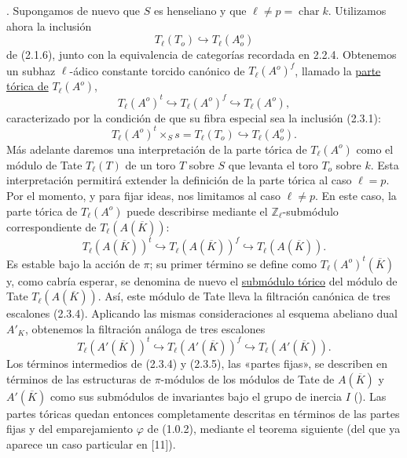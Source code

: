 \par\medskip
{}. Supongamos de nuevo que $S$ es henseliano y que
$\ell\ne p=\operatorname{char}k$. Utilizamos ahora la inclusión
\begin{equation}\tag{2.3.1}
 T_\ell(T_o)\hookrightarrow T_\ell(A_o^o)
\end{equation}
de (2.1.6), junto con la equivalencia de categorías recordada en 2.2.4.
Obtenemos un subhaz $\ell$-ádico constante torcido canónico de
$T_\ell(A^o)^f$, llamado la \underline{parte tórica de}
$T_\ell(A^o)$,
\begin{equation}\tag{2.3.2}
 T_\ell(A^o)^t\hookrightarrow T_\ell(A^o)^f
 \hookrightarrow T_\ell(A^o),
\end{equation}
caracterizado por la condición de que su fibra especial sea la
inclusión (2.3.1):
\begin{equation}\tag{2.3.3}
 T_\ell(A^o)^t\times_Ss=T_\ell(T_o)
 \hookrightarrow T_\ell(A_o^o).
\end{equation}
Más adelante daremos una interpretación de la parte tórica de
$T_\ell(A^o)$ como el módulo de Tate $T_\ell(T)$ de un toro $T$ sobre
$S$ que levanta el toro $T_o$ sobre $k$. Esta interpretación permitirá
extender la definición de la parte tórica al caso $\ell=p$. Por el
momento, y para fijar ideas, nos limitamos al caso $\ell\ne p$. En este
caso, la parte tórica de $T_\ell(A^o)$ puede describirse mediante el
$\mathbb Z_\ell$-submódulo correspondiente de
$T_\ell(A(\overline K))$:
\begin{equation}\tag{2.3.4}
 T_\ell(A(\overline K))^t\hookrightarrow
 T_\ell(A(\overline K))^f\hookrightarrow
 T_\ell(A(\overline K)).
\end{equation}
Es estable bajo la acción de $\pi$; su primer término se define como
$T_\ell(A^o)^t(\overline K)$ y, como cabría esperar, se denomina de
nuevo el \underline{submódulo tórico} del módulo de Tate
$T_\ell(A(\overline K))$. Así, este módulo de Tate lleva la filtración
canónica de tres escalones (2.3.4). Aplicando las mismas consideraciones
al esquema abeliano dual $A'_K$, obtenemos la filtración análoga de tres
escalones
\begin{equation}\tag{2.3.5}
 T_\ell(A'(\overline K))^t\hookrightarrow
 T_\ell(A'(\overline K))^f\hookrightarrow
 T_\ell(A'(\overline K)).
\end{equation}
Los términos intermedios de (2.3.4) y (2.3.5), las «partes fijas», se
describen en términos de las estructuras de $\pi$-módulos de los
módulos de Tate de $A(\overline K)$ y $A'(\overline K)$ como sus
submódulos de invariantes bajo el grupo de inercia $I$
(). Las partes tóricas quedan entonces completamente
descritas en términos de las partes fijas y del emparejamiento
$\varphi$ de (1.0.2), mediante el teorema siguiente (del que ya aparece
un caso particular en [11]).

